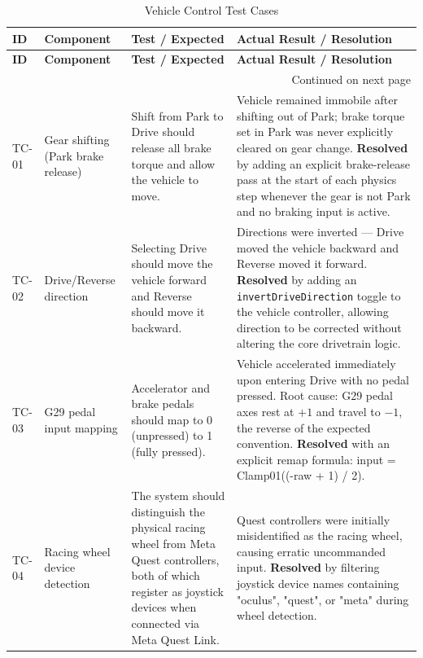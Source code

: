 {\small
\begin{longtable}{|p{1.3cm}|p{3cm}|p{4.5cm}|p{4.5cm}|}
\caption{Vehicle Control Test Cases}\label{tab:tc_vehicle}\\
\hline
\textbf{ID} & \textbf{Component} & \textbf{Test / Expected} & \textbf{Actual Result / Resolution} \\ \hline
\endfirsthead
\hline
\textbf{ID} & \textbf{Component} & \textbf{Test / Expected} & \textbf{Actual Result / Resolution} \\ \hline
\endhead
\hline \multicolumn{4}{r}{{Continued on next page}} \\
\endfoot
\endlastfoot

TC-01 & Gear shifting (Park brake release) & Shift from Park to Drive should release all brake torque and allow the vehicle to move. & Vehicle remained immobile after shifting out of Park; brake torque set in Park was never explicitly cleared on gear change. \textbf{Resolved} by adding an explicit brake-release pass at the start of each physics step whenever the gear is not Park and no braking input is active. \\ \hline

TC-02 & Drive/Reverse direction & Selecting Drive should move the vehicle forward and Reverse should move it backward. & Directions were inverted — Drive moved the vehicle backward and Reverse moved it forward. \textbf{Resolved} by adding an \texttt{invertDriveDirection} toggle to the vehicle controller, allowing direction to be corrected without altering the core drivetrain logic. \\ \hline

TC-03 & G29 pedal input mapping & Accelerator and brake pedals should map to 0 (unpressed) to 1 (fully pressed). & Vehicle accelerated immediately upon entering Drive with no pedal pressed. Root cause: G29 pedal axes rest at $+1$ and travel to $-1$, the reverse of the expected convention. \textbf{Resolved} with an explicit remap formula: input = Clamp01((-raw + 1) / 2). \\ \hline

TC-04 & Racing wheel device detection & The system should distinguish the physical racing wheel from Meta Quest controllers, both of which register as joystick devices when connected via Meta Quest Link. & Quest controllers were initially misidentified as the racing wheel, causing erratic uncommanded input. \textbf{Resolved} by filtering joystick device names containing "oculus", "quest", or "meta" during wheel detection. \\ \hline


\end{longtable}}
